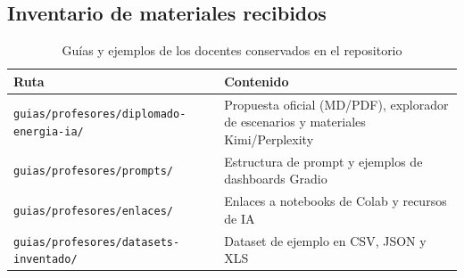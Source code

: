 \subsection{Inventario de materiales recibidos}
\begin{table}[p]
\caption{Guías y ejemplos de los docentes conservados en el repositorio}
\centering\footnotesize
\begin{tabular}{@{}ll@{}}
\toprule
Ruta & Contenido \\
\midrule
\texttt{guias/profesores/diplomado-energia-ia/} & Propuesta oficial (MD/PDF), explorador de escenarios y materiales Kimi/Perplexity \\
\texttt{guias/profesores/prompts/} & Estructura de prompt y ejemplos de dashboards Gradio \\
\texttt{guias/profesores/enlaces/} & Enlaces a notebooks de Colab y recursos de IA \\
\texttt{guias/profesores/datasets-inventado/} & Dataset de ejemplo en CSV, JSON y XLS \\
\bottomrule
\end{tabular}
\end{table}
